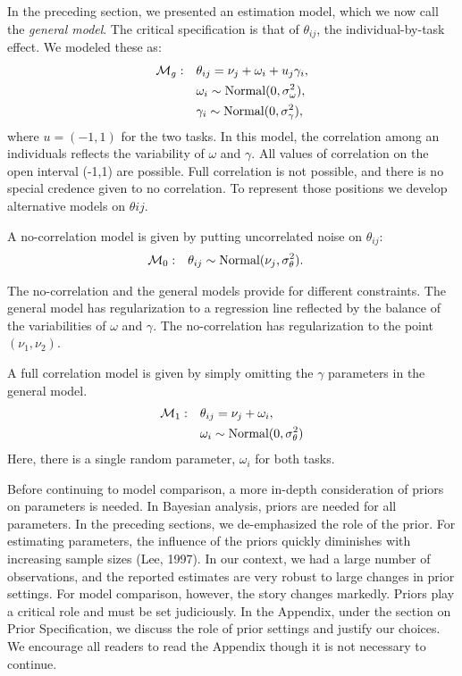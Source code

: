 \documentclass[english,man]{apa6}
\theoremstyle{definition}
\theoremstyle{definition}
\theoremstyle{remark}
\begin{document}
In the preceding section, we presented an estimation model, which we now
call the \emph{general model}. The critical specification is that of
\(\theta_{ij}\), the individual-by-task effect. We modeled these as:
\[ \begin{aligned}
{\cal M}_g: \quad & \theta_{ij}=\nu_j+\omega_i+u_j\gamma_i,\\
& \omega_i \sim \mbox{Normal}(0,\sigma^2_\omega),\\
& \gamma_i \sim \mbox{Normal}(0,\sigma^2_\gamma),
\end{aligned}
\] where \(u=(-1,1)\) for the two tasks. In this model, the correlation
among an individuals reflects the variability of \(\omega\) and
\(\gamma\). All values of correlation on the open interval (-1,1) are
possible. Full correlation is not possible, and there is no special
credence given to no correlation. To represent those positions we
develop alternative models on \(\theta{ij}\).

A no-correlation model is given by putting uncorrelated noise on
\(\theta_{ij}\): \[
\begin{aligned}
{\cal M}_0: \quad & \theta_{ij} \sim \mbox{Normal}(\nu_j,\sigma^2_\theta).
\end{aligned}\]

The no-correlation and the general models provide for different
constraints. The general model has regularization to a regression line
reflected by the balance of the variabilities of \(\omega\) and
\(\gamma\). The no-correlation has regularization to the point
\((\nu_1,\nu_2)\).

A full correlation model is given by simply omitting the \(\gamma\)
parameters in the general model. \[
\begin{aligned}
{\cal M}_1: \quad & \theta_{ij}=\nu_j+\omega_i,\\
& \omega_i \sim \mbox{Normal}(0,\sigma^2_\theta)
\end{aligned}
\] Here, there is a single random parameter, \(\omega_i\) for both
tasks.

Before continuing to model comparison, a more in-depth consideration of
priors on parameters is needed. In Bayesian analysis, priors are needed
for all parameters. In the preceding sections, we de-emphasized the role
of the prior. For estimating parameters, the influence of the priors
quickly diminishes with increasing sample sizes (Lee, 1997). In our
context, we had a large number of observations, and the reported
estimates are very robust to large changes in prior settings. For model
comparison, however, the story changes markedly. Priors play a critical
role and must be set judiciously. In the Appendix, under the section on
Prior Specification, we discuss the role of prior settings and justify
our choices. We encourage all readers to read the Appendix though it is
not necessary to continue.
\end{document}
